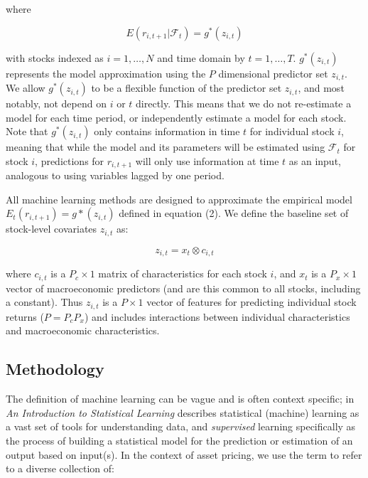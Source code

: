 \documentclass[11pt, a4paper, table]{article}
\begin{document}
where 

\begin{equation}
	E(r_{i, t+1} | \mathcal{F}_t) = g^*(z_{i,t})
\end{equation}

with stocks indexed as $i = 1, \dots, N$ and time domain by $t = 1, \dots, T$. $g^*(z_{i,t})$ represents the model approximation using the $P$ dimensional predictor set $z_{i,t}$. We allow $g^*(z_{i,t})$ to be a flexible function of the predictor set $z_{i,t}$, and most notably, not depend on $i$ or $t$ directly. This means that we do not re-estimate a model for each time period, or independently estimate a model for each stock. Note that $g^*(z_{i,t})$ only contains information in time $t$ for individual stock $i$, meaning that while the model and its parameters will be estimated using $\mathcal{F}_t$ for stock $i$, predictions for $r_{i, t+1}$ will only use information at time $t$ as an input, analogous to using variables lagged by one period. 

All machine learning methods are designed to approximate the empirical model \( E_t(r_{i, t+1}) = g*(z_{i,t}) \) defined in equation (2). We define the baseline set of stock-level covariates \( z_{i,t} \) as:

\begin{equation}
\label{kronecker_equation}
z_{i,t} = x_t \otimes c_{i,t}
\end{equation}

where \( c_{i,t} \) is a \( P_c \times 1 \) matrix of characteristics for each stock \(i\), and \(x_t\) is a $P_x \times 1$ vector of macroeconomic predictors (and are this common to all stocks, including a constant). Thus $z_{i,t}$ is a $P \times 1$ vector of features for predicting individual stock returns ($P = P_cP_x$) and includes interactions between individual characteristics and macroeconomic characteristics. 

\subsection{Methodology}

The definition of machine learning can be vague and is often context specific; \cite{hastie_elements_2009} in \textit{An Introduction to Statistical Learning} describes statistical (machine) learning as a vast set of tools for understanding data, and \textit{supervised} learning specifically as the process of building a statistical model for the prediction or estimation of an output based on input(s). In the context of asset pricing, we use the term to refer to a diverse collection of:
\end{document}
